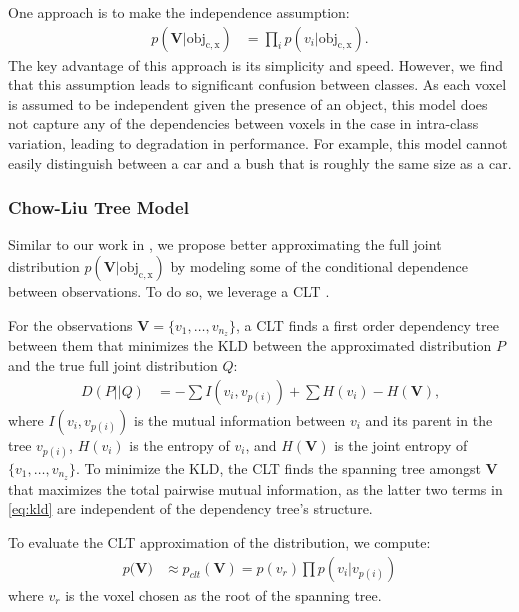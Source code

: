 One approach is to make the independence assumption:
%
\begin{align}
  p(\mathbf{V} | \mathrm{obj_{c, x}}) &= \prod_i p(v_i | \mathrm{obj_{c, x}})
  \text{.}
  \label{eq:naive}
\end{align}
%
The key advantage of this approach is its simplicity and speed.
However, we find that this assumption leads to significant confusion between
classes. As each voxel is assumed to be independent given the presence of an
object, this model does not capture any of the dependencies between voxels in
the case in intra-class variation, leading to degradation in performance. For
example, this model cannot easily distinguish between a car and a bush that is
roughly the same size as a car.

\subsubsection{Chow-Liu Tree Model} \label{sec:clt}

Similar to our work in \cite{ushani_raybased}, we propose better approximating
the full joint distribution $p(\mathbf{V} | \mathrm{obj_{c,x}})$ by modeling
some of the conditional dependence between observations. To do so, we leverage a
\ac{CLT} \citep{chow1968approximating}.

For the observations $\mathbf{V} = \{v_1, \ldots, v_{n_z}\}$, a \ac{CLT} finds a
first order dependency tree between them that minimizes the \ac{KLD} between the
approximated distribution $P$ and the true full joint distribution $Q$:
%
\begin{align}
  D(P || Q) &= -\sum I(v_i, v_{p(i)}) + \sum H(v_i) - H(\mathbf{V})
  \label{eq:kld}
  \text{,}
\end{align}
%
where $I(v_i, v_{p(i)})$ is the mutual information between $v_i$ and its parent
in the tree $v_{p(i)}$, $H(v_i)$ is the entropy of $v_i$, and $H(\mathbf{V})$ is
the joint entropy of $\{v_1, \ldots, v_{n_z}\}$. To minimize the \ac{KLD}, the
\ac{CLT} finds the spanning tree amongst $\mathbf{V}$ that maximizes the total
pairwise mutual information, as the latter two terms in \eqref{eq:kld} are
independent of the dependency tree's structure.

To evaluate the \ac{CLT} approximation of the distribution, we compute:
%
\begin{align}
  p(\mathbf{V)} &\approx p_{clt}(\mathbf{V}) = p(v_r) \prod p(v_i | v_{p(i)})
\end{align}
%
where $v_r$ is the voxel chosen as the root of the spanning tree.

